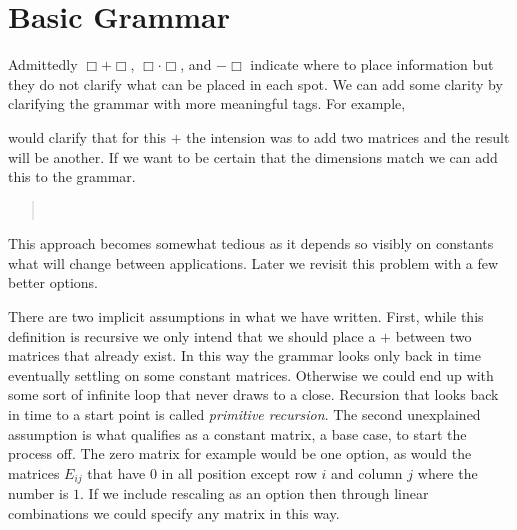 \section{Basic Grammar}
Admittedly  $\Box+\Box$, $\Box\cdot \Box$, and $-\Box$ indicate where to place 
information but they do not clarify what can be placed in each spot. 
We can add some clarity by clarifying the grammar with more meaningful tags.
For example, 
\begin{center}
\end{center}
would clarify that for this $+$ the intension was to add two matrices and 
the result will be another.   If we want to be certain that the dimensions 
match we can add this to the grammar.
\begin{quote}
    \\
\end{quote}
This approach becomes somewhat tedious as it depends so visibly on 
constants what will change between applications.  Later we revisit 
this problem with a few better options.


There are two implicit assumptions in what 
we have written.  First, while this definition is recursive we only intend 
that we should place a $+$ between two matrices that already exist.  In this 
way the grammar looks only back in time eventually settling on some constant
matrices.  Otherwise we could end up with some sort of infinite loop that 
never draws to a close.  Recursion that looks back in time to a start point is 
called \emph{primitive recursion}.  The second unexplained assumption is what 
qualifies as a constant matrix, a base case, to start the process off. 
The zero matrix for example would be one option, as would the matrices 
$E_{ij}$ that have $0$ in all position except row $i$ and column $j$ where 
the number is $1$.  If we include rescaling as an option then through 
linear combinations we could specify any matrix in this way.

